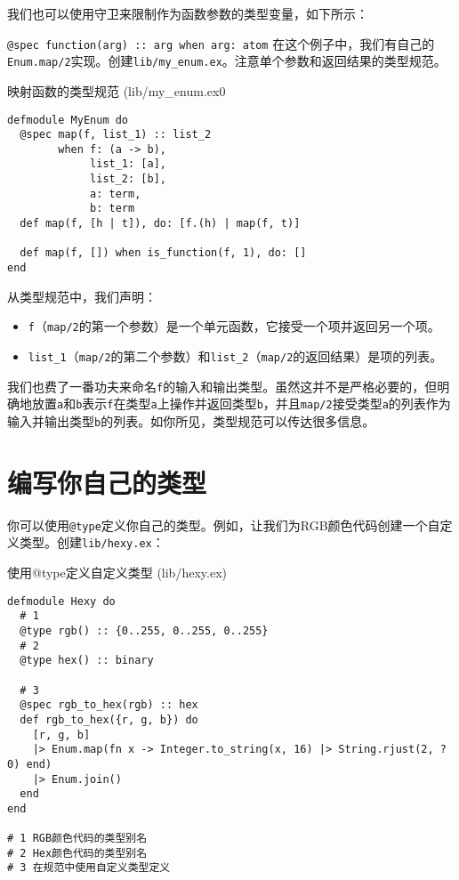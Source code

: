 我们也可以使用守卫来限制作为函数参数的类型变量，如下所示：

\texttt{@spec function(arg) :: arg when arg: atom}
在这个例子中，我们有自己的\texttt{Enum.map/2}实现。创建\texttt{lib/my\_enum.ex}。注意单个参数和返回结果的类型规范。

\begin{code}{映射函数的类型规范 (lib/my\_enum.ex0}

\begin{verbatim}
defmodule MyEnum do
  @spec map(f, list_1) :: list_2
        when f: (a -> b),
             list_1: [a],
             list_2: [b],
             a: term,
             b: term
  def map(f, [h | t]), do: [f.(h) | map(f, t)]

  def map(f, []) when is_function(f, 1), do: []
end
\end{verbatim}
\end{code}

从类型规范中，我们声明：

\begin{itemize}
\item  \texttt{f}（\texttt{map/2}的第一个参数）是一个单元函数，它接受一个项并返回另一个项。
\item  \texttt{list\_1}（\texttt{map/2}的第二个参数）和\texttt{list\_2}（\texttt{map/2}的返回结果）是项的列表。
\end{itemize}

我们也费了一番功夫来命名\texttt{f}的输入和输出类型。虽然这并不是严格必要的，但明确地放置\texttt{a}和\texttt{b}表示\texttt{f}在类型\texttt{a}上操作并返回类型\texttt{b}，并且\texttt{map/2}接受类型\texttt{a}的列表作为输入并输出类型\texttt{b}的列表。如你所见，类型规范可以传达很多信息。

\section{编写你自己的类型}

你可以使用\texttt{@type}定义你自己的类型。例如，让我们为RGB颜色代码创建一个自定义类型。创建\texttt{lib/hexy.ex}：

\begin{code}{使用@type定义自定义类型 (lib/hexy.ex)}

\begin{verbatim}
defmodule Hexy do
  # 1
  @type rgb() :: {0..255, 0..255, 0..255}
  # 2
  @type hex() :: binary

  # 3
  @spec rgb_to_hex(rgb) :: hex
  def rgb_to_hex({r, g, b}) do
    [r, g, b]
    |> Enum.map(fn x -> Integer.to_string(x, 16) |> String.rjust(2, ?0) end)
    |> Enum.join()
  end
end

# 1 RGB颜色代码的类型别名
# 2 Hex颜色代码的类型别名
# 3 在规范中使用自定义类型定义
\end{verbatim}
\end{code}


